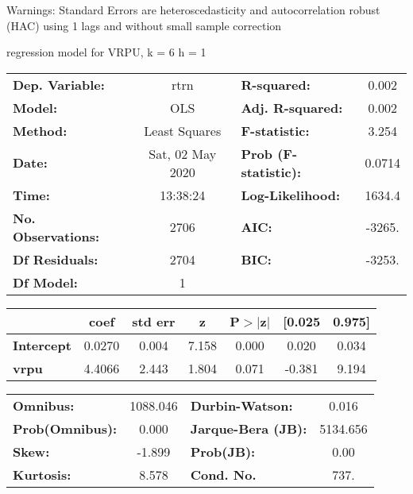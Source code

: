 Warnings: \newline
 [1] Standard Errors are heteroscedasticity and autocorrelation robust (HAC) using 1 lags and without small sample correction\ 

regression model for VRPU, k = 6 h = 1\begin{center}
\begin{tabular}{lclc}
\toprule
\textbf{Dep. Variable:}    &       rtrn       & \textbf{  R-squared:         } &     0.002   \\
\textbf{Model:}            &       OLS        & \textbf{  Adj. R-squared:    } &     0.002   \\
\textbf{Method:}           &  Least Squares   & \textbf{  F-statistic:       } &     3.254   \\
\textbf{Date:}             & Sat, 02 May 2020 & \textbf{  Prob (F-statistic):} &   0.0714    \\
\textbf{Time:}             &     13:38:24     & \textbf{  Log-Likelihood:    } &    1634.4   \\
\textbf{No. Observations:} &        2706      & \textbf{  AIC:               } &    -3265.   \\
\textbf{Df Residuals:}     &        2704      & \textbf{  BIC:               } &    -3253.   \\
\textbf{Df Model:}         &           1      & \textbf{                     } &             \\
\bottomrule
\end{tabular}
\begin{tabular}{lcccccc}
                   & \textbf{coef} & \textbf{std err} & \textbf{z} & \textbf{P$> |$z$|$} & \textbf{[0.025} & \textbf{0.975]}  \\
\midrule
\textbf{Intercept} &       0.0270  &        0.004     &     7.158  &         0.000        &        0.020    &        0.034     \\
\textbf{vrpu}      &       4.4066  &        2.443     &     1.804  &         0.071        &       -0.381    &        9.194     \\
\bottomrule
\end{tabular}
\begin{tabular}{lclc}
\textbf{Omnibus:}       & 1088.046 & \textbf{  Durbin-Watson:     } &    0.016  \\
\textbf{Prob(Omnibus):} &   0.000  & \textbf{  Jarque-Bera (JB):  } & 5134.656  \\
\textbf{Skew:}          &  -1.899  & \textbf{  Prob(JB):          } &     0.00  \\
\textbf{Kurtosis:}      &   8.578  & \textbf{  Cond. No.          } &     737.  \\
\bottomrule
\end{tabular}
\end{center}

